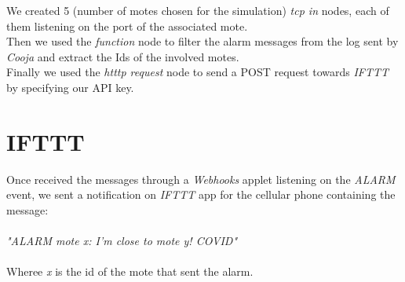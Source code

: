 \documentclass{article}
\begin{document}
We created 5 (number of motes chosen for the simulation) \textit{tcp in} nodes, each of them listening on the port of the associated mote.\\
Then we used the \textit{function} node to filter the alarm messages from the log sent by \textit{Cooja} and extract the Ids of the involved motes.\\
Finally we used the \textit{htttp request} node to send a POST request towards \textit{IFTTT} by specifying our API key.

\section{IFTTT}
Once received the messages through a \textit{Webhooks} applet listening on the \textit{ALARM} event,
we sent a notification on \textit{IFTTT} app for the cellular phone containing the message:\\\\
\textit{"ALARM mote x: I'm close to mote y! COVID"}\\\\
Wheree \textit{x} is the id of the mote that sent the alarm.
\end{document}
